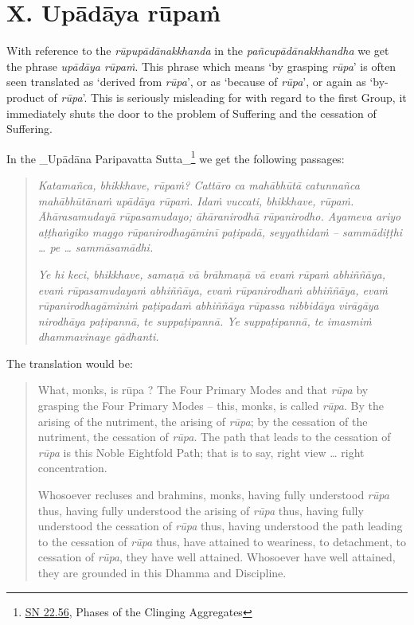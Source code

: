\hypertarget{_x_upux101dux101ya_rux16bpaux1e41}{%
\section{X. Upādāya rūpaṁ}\label{_x_upux101dux101ya_rux16bpaux1e41}}

With reference to the \emph{rūpupādānakkhanda} in the \emph{pañcupādānakkhandha} we get the phrase \emph{upādāya rūpaṁ}. This phrase which means `by grasping \emph{rūpa}' is often seen translated as `derived from \emph{rūpa}', or as `because of \emph{rūpa}', or again as `by-product of \emph{rūpa}'. This is seriously misleading for with regard to the first Group, it immediately shuts the door to the problem of Suffering and the cessation of Suffering.

In the \_Upādāna Paripavatta Sutta\_\footnote{\href{https://suttacentral.net/sn22.56/en/bodhi}{SN 22.56}, Phases of the Clinging Aggregates} we get the following passages:

\begin{quote}
\emph{Katamañca, bhikkhave, rūpaṁ? Cattāro ca mahābhūtā catunnañca mahābhūtānaṁ upādāya rūpaṁ. Idaṁ vuccati, bhikkhave, rūpaṁ. Āhārasamudayā rūpasamudayo; āhāranirodhā rūpanirodho. Ayameva ariyo aṭṭhaṅgiko maggo rūpanirodhagāminī paṭipadā, seyyathidaṁ -- sammādiṭṭhi \ldots\hspace{0pt} pe \ldots\hspace{0pt} sammāsamādhi.}

\emph{Ye hi keci, bhikkhave, samaṇā vā brāhmaṇā vā evaṁ rūpaṁ abhiññāya, evaṁ rūpasamudayaṁ abhiññāya, evaṁ rūpanirodhaṁ abhiññāya, evaṁ rūpanirodhagāminiṁ paṭipadaṁ abhiññāya rūpassa nibbidāya virāgāya nirodhāya paṭipannā, te suppaṭipannā. Ye suppaṭipannā, te imasmiṁ dhammavinaye gādhanti.}
\end{quote}

The translation would be:

\begin{quote}
What, monks, is rūpa ? The Four Primary Modes and that \emph{rūpa} by grasping the Four Primary Modes -- this, monks, is called \emph{rūpa}. By the arising of the nutriment, the arising of \emph{rūpa}; by the cessation of the nutriment, the cessation of \emph{rūpa}. The path that leads to the cessation of \emph{rūpa} is this Noble Eightfold Path; that is to say, right view \ldots\hspace{0pt} right concentration.

Whosoever recluses and brahmins, monks, having fully understood \emph{rūpa} thus, having fully understood the arising of \emph{rūpa} thus, having fully understood the cessation of \emph{rūpa} thus, having understood the path leading to the cessation of \emph{rūpa} thus, have attained to weariness, to detachment, to cessation of \emph{rūpa}, they have well attained. Whosoever have well attained, they are grounded in this Dhamma and Discipline.
\end{quote}

